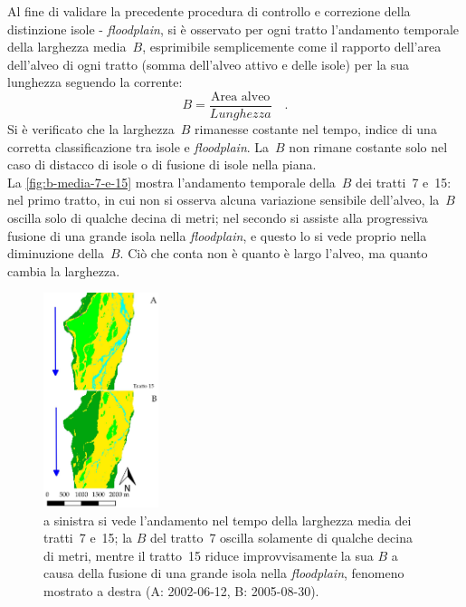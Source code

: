 \begin{description}
Al fine di validare la precedente procedura di controllo e correzione della distinzione isole - \emph{floodplain}, si è osservato per ogni tratto l'andamento temporale della larghezza media~$B$, esprimibile semplicemente come il rapporto dell'area dell'alveo di ogni tratto (somma dell'alveo attivo e delle isole) per la sua lunghezza seguendo la corrente:
	\begin{equation}
		\label{eq:larghezza-tratto}
		B = \frac{\text{Area alveo}}{Lunghezza} 
		\quad .
	\end{equation}
	Si è verificato che la larghezza~$B$ rimanesse costante nel tempo, indice di una corretta classificazione tra isole e \emph{floodplain}. 
	La~$B$ non rimane costante solo nel caso di distacco di isole o di fusione di isole nella piana. 
	\\
	La \vref{fig:b-media-7-e-15} mostra l'andamento temporale della~$B$ dei tratti~7 e~15: nel primo tratto, in cui non si osserva alcuna variazione sensibile dell'alveo, la~$B$ oscilla solo di qualche decina di metri; nel secondo si assiste alla progressiva fusione di una grande isola nella \emph{floodplain}, e questo lo si vede proprio nella diminuzione della~$B$. Ciò che conta non è quanto è largo l'alveo, ma quanto cambia la larghezza.
	\begin{figure}
		\centering
		
		\quad
		\includegraphics[width=0.3\textwidth]{files/fusione_isola_tr_15.jpeg}
		\caption[andamento temporale di $B$ per i tratti~7 e~15]{a sinistra si vede l'andamento nel tempo della larghezza media dei tratti~7 e~15; la $B$ del tratto~7 oscilla solamente di qualche decina di metri, mentre il tratto~15 riduce improvvisamente la sua $B$ a causa della fusione di una grande isola nella \emph{floodplain}, fenomeno mostrato a destra (A: 2002-06-12, B: 2005-08-30).}
		\label{fig:b-media-7-e-15}

\end{figure}
\end{description}

